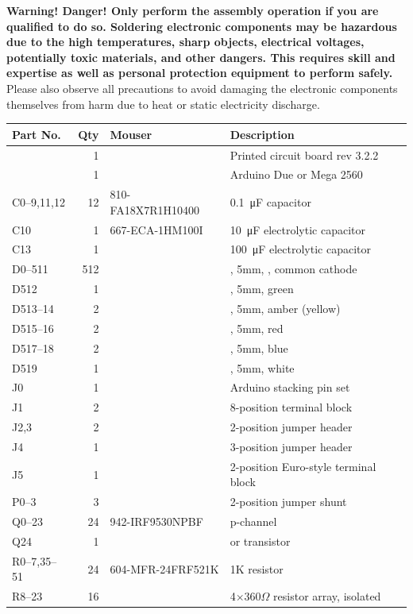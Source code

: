 {\bfseries Warning! Danger! Only perform the assembly operation if you are qualified to do so. Soldering electronic components
may be hazardous due to the high temperatures, sharp objects, electrical voltages, potentially toxic materials,
and other dangers. This requires skill and expertise as well as personal protection equipment to perform safely.}
Please also observe all precautions to avoid damaging the electronic components themselves from harm due to
heat or static electricity discharge.
\newcommand\mouser[1]{{\sffamily\footnotesize#1}}
\begin{table}
	\begin{tabular}{lrll}\toprule
		{\bfseries Part No.}&{\bfseries Qty}&{\bfseries Mouser}&{\bfseries Description}\\\midrule
		&1&&Printed circuit board rev 3.2.2\\
		&1&&Arduino Due or Mega 2560\\
		C0--9,11,12&12&\mouser{810-FA18X7R1H10400}&\SI{0.1}{\micro\farad} capacitor\\
		C10&1&\mouser{667-ECA-1HM100I}&\SI{10}{\micro\farad} electrolytic capacitor\\
		C13&1&&\SI{100}{\micro\farad} electrolytic capacitor\\
		D0--511&512&&\led, 5mm, \acronym{RGB}, common cathode\\
		D512&1&&\led, 5mm, green\\
		D513--14&2&&\led, 5mm, amber (yellow)\\
		D515--16&2&&\led, 5mm, red\\
		D517--18&2&&\led, 5mm, blue\\
		D519&1&&\led, 5mm, white\\
		J0&1&&Arduino stacking pin set\\
		J1&2&&8-position terminal block\\
		J2,3&2&&2-position jumper header\\
		J4&1&&3-position jumper header\\
		J5&1&&2-position Euro-style terminal block\\
		P0--3&3&&2-position jumper shunt\\
		Q0--23&24&\mouser{942-IRF9530NPBF}&\mc{IRF9530} p-channel \acronym{MOSFET}\\
		Q24&1&&\mc{2N2222} or \mc{BC547} \mc{NPN} transistor\\
		R0--7,35--51&24&\mouser{604-MFR-24FRF521K}&1K resistor\\
		R8--23&16&&4$\times$360$\Omega$ resistor array, isolated\\

\end{tabular}
\end{table}
